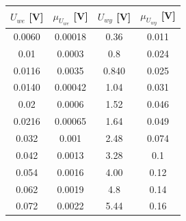 \documentclass[10pt,a4paper]{article}
\begin{document}
\begin{table}[htp!]
\begin{center}
\begin{tabular}{|c|c|c|c|}
\hline
\multicolumn{1}{|l|}{$U_{we}$ {[}V{]}} & \multicolumn{1}{l|}{$\mu_{U_{we}}$ {[}V{]}} & \multicolumn{1}{l|}{$U_{wy}$ {[}V{]}} & \multicolumn{1}{l|}{$\mu_{U_{wy}}$ {[}V{]}} \\ \hline
0.0060                                 & 0.00018                                     & 0.36                                  & 0.011                                       \\
0.01                                   & 0.0003                                      & 0.8                                   & 0.024                                       \\
0.0116                                 & 0.0035                                      & 0.840                                 & 0.025                                       \\
0.0140                                 & 0.00042                                     & 1.04                                  & 0.031                                       \\
0.02                                   & 0.0006                                      & 1.52                                  & 0.046                                       \\
0.0216                                 & 0.00065                                     & 1.64                                  & 0.049                                       \\
0.032                                  & 0.001                                       & 2.48                                  & 0.074                                       \\
0.042                                  & 0.0013                                      & 3.28                                  & 0.1                                         \\
0.054                                  & 0.0016                                      & 4.00                                  & 0.12                                        \\
0.062                                  & 0.0019                                      & 4.8                                   & 0.14                                        \\
0.072                                  & 0.0022                                      & 5.44                                  & 0.16                                        \\

\end{tabular}
\end{center}
\end{table}
\end{document}
